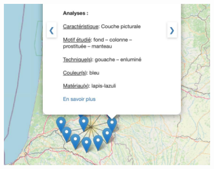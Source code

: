 \begin{landscape}
\begin{figure}[p]
\begin{minipage}{0.65\linewidth}
\begin{minipage}{\linewidth}
				\includegraphics[scale=0.2]{./textes/chap2/carrousel-2.jpg}
				\label{fig:carrousel2}
			\end{minipage}
		\end{minipage}\hfill
		\begin{minipage}{0.3\linewidth} %
			\centering

\end{minipage}
\end{figure}
\end{landscape}
